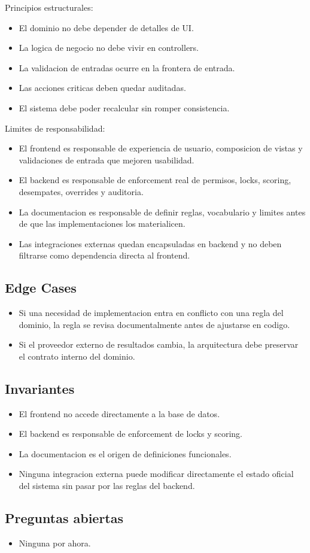Principios estructurales:

\begin{itemize}
  \item El dominio no debe depender de detalles de UI.
  \item La logica de negocio no debe vivir en controllers.
  \item La validacion de entradas ocurre en la frontera de entrada.
  \item Las acciones criticas deben quedar auditadas.
  \item El sistema debe poder recalcular sin romper consistencia.
\end{itemize}

Limites de responsabilidad:

\begin{itemize}
  \item El frontend es responsable de experiencia de usuario, composicion de vistas y validaciones de entrada que mejoren usabilidad.
  \item El backend es responsable de enforcement real de permisos, locks, scoring, desempates, overrides y auditoria.
  \item La documentacion es responsable de definir reglas, vocabulario y limites antes de que las implementaciones los materialicen.
  \item Las integraciones externas quedan encapsuladas en backend y no deben filtrarse como dependencia directa al frontend.
\end{itemize}

\subsection{Edge Cases}

\begin{itemize}
  \item Si una necesidad de implementacion entra en conflicto con una regla del dominio, la regla se revisa documentalmente antes de ajustarse en codigo.
  \item Si el proveedor externo de resultados cambia, la arquitectura debe preservar el contrato interno del dominio.
\end{itemize}

\subsection{Invariantes}

\begin{itemize}
  \item El frontend no accede directamente a la base de datos.
  \item El backend es responsable de enforcement de locks y scoring.
  \item La documentacion es el origen de definiciones funcionales.
  \item Ninguna integracion externa puede modificar directamente el estado oficial del sistema sin pasar por las reglas del backend.
\end{itemize}

\subsection{Preguntas abiertas}

\begin{itemize}
  \item Ninguna por ahora.
\end{itemize}
